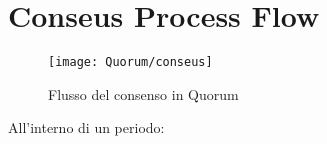 %
%
\chapter{Conseus Process Flow}
%
\label{cap:conseus}
%
%
\begin{figure}[H]
	\centering
	\texttt{[image: Quorum/conseus]}
	\caption{Flusso del consenso in Quorum}
	\label{fig:flusso del consenso di quorum}
\end{figure}
%
All'interno di un periodo:
